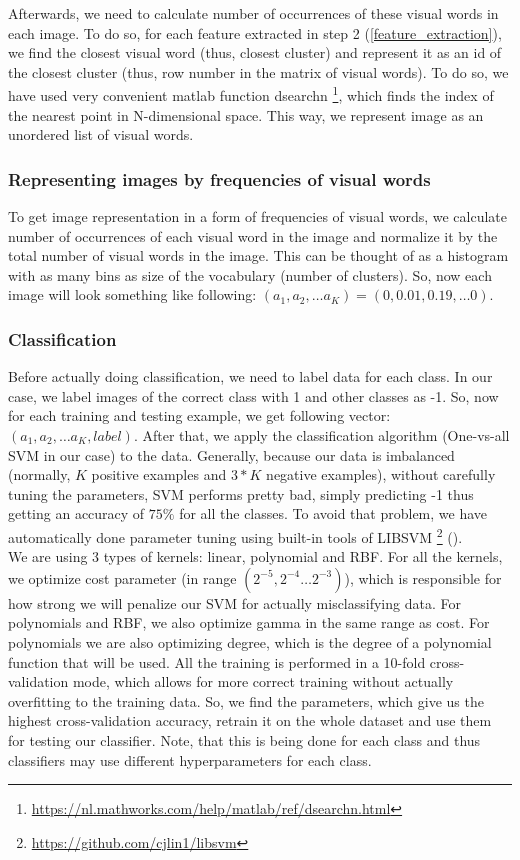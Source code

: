\documentclass{article}
\begin{document}
Afterwards, we need to calculate number of occurrences of these visual words in each image. To do so, for each feature extracted in step 2 (\cref{feature_extraction}), we find the closest visual word (thus, closest cluster) and represent it as an id of the closest cluster (thus, row number in the matrix of visual words). To do so, we have used very convenient matlab function dsearchn \footnote{\url{https://nl.mathworks.com/help/matlab/ref/dsearchn.html}}, which finds the index of the nearest point in N-dimensional space. This way, we represent image as an unordered list of visual words.

\subsubsection{Representing images by frequencies of visual words}

To get image representation in a form of frequencies of visual words, we calculate number of occurrences of each visual word in the image and normalize it by the total number of visual words in the image. This can be thought of as a histogram with as many bins as size of the vocabulary (number of clusters). So, now each image will look something like following: $(a_1, a_2, \ldots a_{K}) = (0, 0.01, 0.19, \ldots 0)$.

\subsubsection{Classiﬁcation}

Before actually doing classification, we need to label data for each class. In our case, we label images of the correct class with 1 and other classes as -1. So, now for each training and testing example, we get following vector: $(a_1, a_2, \ldots a_K, label)$. 
After that, we apply the classification algorithm (One-vs-all SVM in our case) to the data. Generally, because our data is imbalanced (normally, $K$ positive examples and $3 * K$ negative examples), without carefully tuning the parameters, SVM performs pretty bad, simply predicting -1 thus getting an accuracy of $75\%$ for all the classes. To avoid that problem, we have automatically done parameter tuning using built-in tools of LIBSVM \footnote{\url{https://github.com/cjlin1/libsvm}} (\cite{libsvm}). \\
We are using 3 types of kernels: linear, polynomial and RBF. For all the kernels, we optimize cost parameter (in range $(2^{-5}, 2^{-4} \ldots 2^{-3})$), which is responsible for how strong we will penalize our SVM for actually misclassifying data. For polynomials and RBF, we also optimize gamma in the same range as cost. For polynomials we are also optimizing degree, which is the degree of a polynomial function that will be used. 
All the training is performed in a 10-fold cross-validation mode, which allows for more correct training without actually overfitting to the training data. So, we find the parameters, which give us the highest cross-validation accuracy, retrain it on the whole dataset and use them for testing our classifier. 
Note, that this is being done for each class and thus classifiers may use different hyperparameters for each class.
\end{document}
